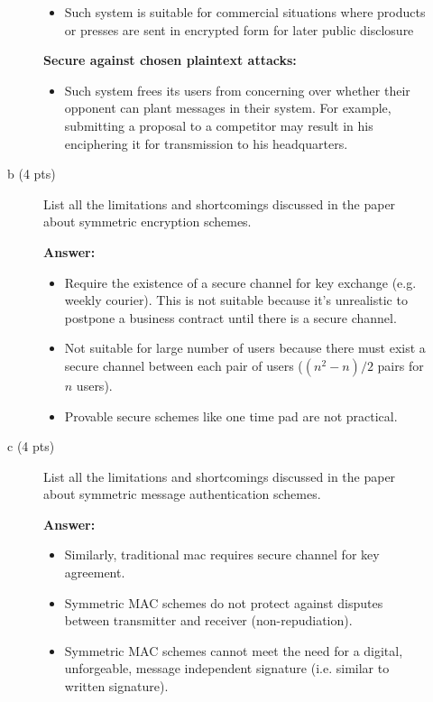 \documentclass[11pt]{article}
\newcommand{\ans}[1]{\begin{mdframed}\textbf{Answer: }#1\end{mdframed}}
\begin{document}
\begin{description}
\begin{description}
{\begin{itemize}
    \item 
    Such system is suitable for commercial situations where products or presses are sent in encrypted form for later public disclosure
  \end{itemize}
  \textbf{Secure against chosen plaintext attacks:}    
  \begin{itemize}
    \item Such system frees its users from concerning over whether their opponent can plant messages in their system. For example, submitting a proposal to a competitor may result in his enciphering it for transmission to his headquarters.
  \end{itemize}
}
 \item [b (4 pts)]
List all the limitations and shortcomings discussed in the paper about
symmetric encryption schemes.
\ans{
  \begin{itemize}
    \item Require the existence of a secure channel for key exchange (e.g. weekly courier). This is not suitable because it's unrealistic to postpone a business contract until there is a secure channel.
    \item Not suitable for large number of users because there must exist a secure channel between each pair of users ($(n^2-n)/2$ pairs for $n$ users).   
    \item Provable secure schemes like one time pad are not practical.
  \end{itemize}
}
 \item [c (4 pts)]
List all the limitations and shortcomings discussed in the paper about
symmetric message authentication schemes.
\ans{
  \begin{itemize}

    \item Similarly, traditional mac requires secure channel for key agreement. 
    \item Symmetric MAC schemes do not protect against disputes between transmitter and receiver (non-repudiation).  
    \item Symmetric MAC schemes cannot meet the need for a digital, unforgeable, message independent signature (i.e. similar to written signature).


\end{itemize}}
\end{description}
\end{description}
\end{document}
